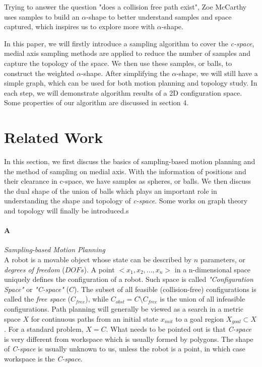 \documentclass[11pt]{article}
\begin{document}
\indent Trying to answer the question "does a collision free path exist", Zoe McCarthy uses samples to build an $\alpha$-shape to better understand samples and space captured, which inspires us to explore more with $\alpha$-shape.

\indent In this paper, we will firstly introduce a sampling algorithm to cover the \emph{c-space}, medial axis sampling methods are applied to reduce the number of samples and capture the topology of the space. We then use these samples, or balls, to construct the weighted $\alpha$-shape. After simplifying the $\alpha$-shape, we will still have a simple graph, which can be used for both motion planning and topology study. In each step, we will demonstrate algorithm results of a 2D configuration space. Some properties of our algorithm are discussed in section 4. 

%

\section{Related Work}\label{related work}

\indent\indent In this section, we first discuss the basics of sampling-based motion planning and the method of sampling on medial axis. With the information of positions and their clearance in c-space, we have samples as spheres, or balls. We then discuss the dual shape of the union of balls which plays an important role in understanding the shape and topology of \emph{c-space}. Some works on graph theory and topology will finally be introduced.s


\paragraph{A} \emph{Sampling-based Motion Planning} \hfill \\
\indent A robot is a movable object whose state can be described by $n$ parameters, or \emph{degrees of freedom} ($DOFs$). A point $<x_1, x_2, ..., x_n>$ in a n-dimensional space uniquely defines the configuration of a robot. Such space is called \emph{"Configuration Space"} or \emph{"C-space"}  ($C$). The subset of all feasible (collision-free) configurations is called the \emph{free space} (\emph{$C_{free}$}), while $C_{obst} = C \setminus C_{free}$ is the union of all infeasible configurations. \cite{UMAPRM} Path planning will generally be viewed as a search in a metric space $X$ for continuous paths from an initial state $x_{init}$ to a goal region $X_{goal} \subset X$. For a standard problem, $X = C$. \cite{RRT} What needs to be pointed out is that \emph{C-space} is very different from workspace which is usually formed by polygons. The shape of \emph{C-space} is usually unknown to us, unless the robot is a point, in which case workspace is the \emph{C-space}. 
\end{document}
